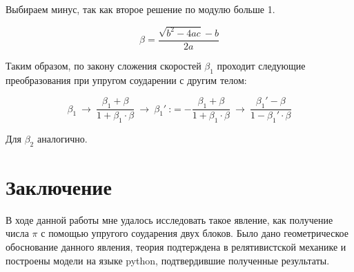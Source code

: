 \documentclass[a4paper,12pt]{article} %
\begin{document}
Выбираем минус, так как второе решение по модулю больше 1.

\[
\beta = \dfrac{\sqrt{b^2 - 4ac} - b}{2a}
\]

Таким образом, по закону сложения скоростей $\beta_1$ проходит следующие преобразования при упругом соударении с другим телом:

\[
\beta_1 \ \rightarrow \ \frac{\beta_1 + \beta}{1 + \beta_1 \cdot \beta} \ \rightarrow \ \beta_1' \ \text{:}= - \frac{\beta_1 + \beta}{1 + \beta_1 \cdot \beta} \ \rightarrow \ \frac{\beta_1' - \beta}{1 - \beta_1' \cdot \beta}
\]

\medskip

Для $\beta_2$ аналогично.

\section*{Заключение}
В ходе данной работы мне удалось исследовать такое явление, как получение числа $\pi$ с помощью упругого соударения двух блоков. Было дано геометрическое обоснование данного явления, теория подтерждена в релятивистской механике и построены модели на языке python, подтвердившие полученные результаты.
\end{document}
